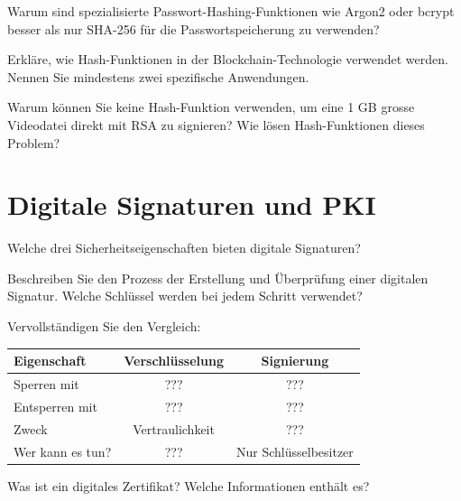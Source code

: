 \documentclass[11pt,a4paper]{report}
\begin{document}
\begin{ex}
Warum sind spezialisierte Passwort-Hashing-Funktionen wie Argon2 oder bcrypt besser als nur SHA-256 für die Passwortspeicherung zu verwenden?
\end{ex}

\begin{ex}
Erkläre, wie Hash-Funktionen in der Blockchain-Technologie verwendet werden. Nennen Sie mindestens zwei spezifische Anwendungen.
\end{ex}

\begin{ex}
Warum können Sie keine Hash-Funktion verwenden, um eine 1 GB grosse Videodatei direkt mit RSA zu signieren? Wie lösen Hash-Funktionen dieses Problem?
\end{ex}

\section{Digitale Signaturen und PKI}

\begin{ex}
Welche drei Sicherheitseigenschaften bieten digitale Signaturen?
\end{ex}

\begin{ex}
Beschreiben Sie den Prozess der Erstellung und Überprüfung einer digitalen Signatur. Welche Schlüssel werden bei jedem Schritt verwendet?
\end{ex}

\begin{ex}
Vervollständigen Sie den Vergleich:

\begin{center}
\begin{tabular}{|l|c|c|}
\hline
\textbf{Eigenschaft} & \textbf{Verschlüsselung} & \textbf{Signierung} \\
\hline
Sperren mit & ??? & ??? \\
Entsperren mit & ??? & ??? \\
Zweck & Vertraulichkeit & ??? \\
Wer kann es tun? & ??? & Nur Schlüsselbesitzer \\
\hline
\end{tabular}
\end{center}
\end{ex}

\begin{ex}
Was ist ein digitales Zertifikat? Welche Informationen enthält es?
\end{ex}
\end{document}
